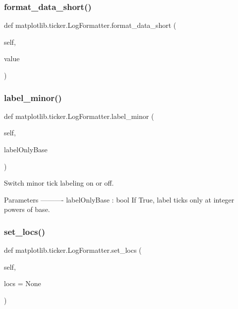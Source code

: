 \subsubsection{\texorpdfstring{format\+\_\+data\+\_\+short()}{format\_data\_short()}}
{\footnotesize\ttfamily def matplotlib.\+ticker.\+Log\+Formatter.\+format\+\_\+data\+\_\+short (\begin{DoxyParamCaption}\item[{}]{self,  }\item[{}]{value }\end{DoxyParamCaption})}

\mbox{\label{classmatplotlib_1_1ticker_1_1LogFormatter_a8161302a1fe9578b01a1214dff788f6f}} 
\subsubsection{\texorpdfstring{label\+\_\+minor()}{label\_minor()}}
{\footnotesize\ttfamily def matplotlib.\+ticker.\+Log\+Formatter.\+label\+\_\+minor (\begin{DoxyParamCaption}\item[{}]{self,  }\item[{}]{label\+Only\+Base }\end{DoxyParamCaption})}

\begin{DoxyVerb}Switch minor tick labeling on or off.

Parameters
----------
labelOnlyBase : bool
    If True, label ticks only at integer powers of base.
\end{DoxyVerb}
 \mbox{\label{classmatplotlib_1_1ticker_1_1LogFormatter_a22b3717775e4efe8ce4c0ee0621ad29a}} 
\subsubsection{\texorpdfstring{set\+\_\+locs()}{set\_locs()}}
{\footnotesize\ttfamily def matplotlib.\+ticker.\+Log\+Formatter.\+set\+\_\+locs (\begin{DoxyParamCaption}\item[{}]{self,  }\item[{}]{locs = {\ttfamily None} }\end{DoxyParamCaption})}

